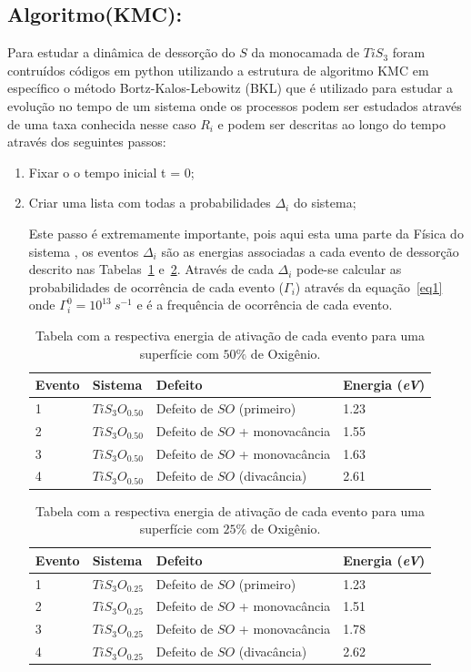\documentclass[11pt]{article}
\begin{document}
\subsection{Algoritmo(KMC):}
\label{sec:orga7d6f8b}
Para estudar a dinâmica de dessorção do \(S\) da monocamada de \(TiS_3\) foram contruídos códigos em python utilizando a estrutura de algoritmo KMC em específico o método Bortz-Kalos-Lebowitz (BKL) que é utilizado para estudar a evolução no tempo de um sistema onde os processos podem ser estudados através de uma taxa conhecida nesse caso \(R_i\) e podem ser descritas ao longo do tempo através dos seguintes passos:
\begin{enumerate}
\item Fixar o o tempo inicial t = 0;
\item Criar uma lista com todas a probabilidades $\Delta_i$ do sistema;

    Este passo é extremamente importante, pois aqui esta uma parte da Física do sistema , os eventos $\Delta_i$ são as energias associadas a cada evento de dessorção descrito nas Tabelas~\ref{t1} e~\ref{t2}. Através de cada $\Delta_i$ pode-se calcular as probabilidades de ocorrência de cada evento ($\Gamma_i$) através da equação~\ref{eq1} onde $\Gamma_{i}^{0}= 10^{13}~s^{-1}$ e é a frequência de ocorrência de cada evento.
\begin{table}[ht]
\centering
\begin{tabular}{| l| l| l| l|}
\hline
\textbf{Evento} & \textbf{Sistema} & \textbf{Defeito} & \textbf{Energia (\textit{eV})}\\
\hline
\hline
1 & $TiS_3O_{0.50}$ & Defeito de $SO$ (primeiro)   & 1.23 \\
\hline
2 & $TiS_3O_{0.50}$ & Defeito de $SO$ + monovacância & 1.55 \\
\hline
3 & $TiS_3O_{0.50}$ & Defeito de $SO$ + monovacância& 1.63 \\
\hline
4 & $TiS_3O_{0.50}$ &  Defeito de $SO$ (divacância)& 2.61 \\
\hline
\end{tabular}
\caption{Tabela com a respectiva energia de ativação de cada evento para uma superfície com $50\%$ de Oxigênio.}
\label{t1}
\end{table}

\begin{table}[ht]
\centering
\begin{tabular}{| l| l| l| l|}
\hline
\textbf{Evento} & \textbf{Sistema} & \textbf{Defeito} & \textbf{Energia (\textit{eV})}\\
\hline
\hline
1 & $TiS_3O_{0.25}$ & Defeito de $SO$ (primeiro)   & 1.23 \\
\hline
2 & $TiS_3O_{0.25}$ & Defeito de $SO$ + monovacância & 1.51 \\
\hline
3 & $TiS_3O_{0.25}$ & Defeito de $SO$ + monovacância& 1.78 \\
\hline
4 & $TiS_3O_{0.25}$ &  Defeito de $SO$ (divacância)& 2.62 \\
\hline
\end{tabular}
\caption{Tabela com a respectiva energia de ativação de cada evento para uma superfície com $25\%$ de Oxigênio.}
\label{t2}
\end{table}




\end{enumerate}
\end{document}
